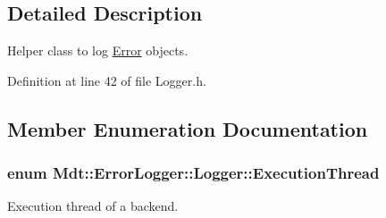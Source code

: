 \subsection{Detailed Description}
Helper class to log \hyperlink{class_mdt_1_1_error}{Error} objects. 

Definition at line 42 of file Logger.\+h.



\subsection{Member Enumeration Documentation}
\subsubsection[{\texorpdfstring{Execution\+Thread}{ExecutionThread}}]{\setlength{\rightskip}{0pt plus 5cm}enum {\bf Mdt\+::\+Error\+Logger\+::\+Logger\+::\+Execution\+Thread}}\hypertarget{class_mdt_1_1_error_logger_1_1_logger_ab6d6198b43b2bb94cede114ec67b781c}{}\label{class_mdt_1_1_error_logger_1_1_logger_ab6d6198b43b2bb94cede114ec67b781c}


Execution thread of a backend. 

